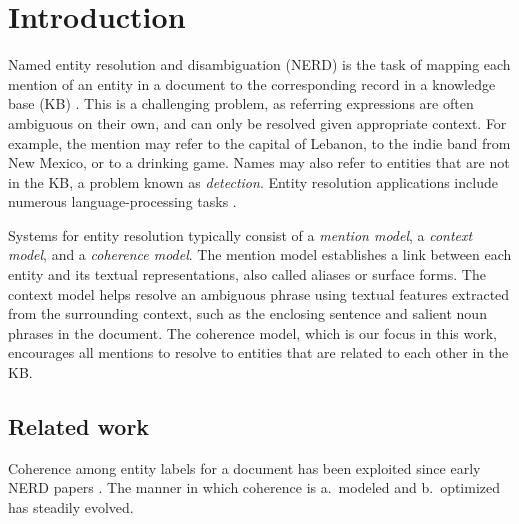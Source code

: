 \section{Introduction}
\label{sec:intro}

Named entity resolution and disambiguation (NERD) is the task of mapping each mention of an entity in a document to the corresponding record in a knowledge base (KB) \cite{BunescuP06,Cucerzan07,KulkarniSRC09,Dredze2010,Hoffart2011,Hachey2013130}.  
This is a challenging problem, as referring expressions are often ambiguous on their own, and can only be resolved given appropriate context. For example, the mention  may refer to the capital of Lebanon, to the indie band from New Mexico, or to a drinking game. Names may also refer to entities that are not in the KB, a problem known as \emph{{\NIL} detection}. 
Entity resolution applications include numerous language-processing tasks  \cite{Gabrilovich2007,Lin2012,finin2009Coreference,mayfield2009cross}. %

Systems for entity resolution typically consist of a \emph{mention model}, a \emph{context model}, and a \emph{coherence model}. The mention model establishes a link between each entity and its textual representations, also called aliases or surface forms. The context model helps resolve an ambiguous phrase using textual features extracted from the surrounding context, such as the enclosing sentence and salient noun phrases in the document. The coherence model, which is our focus in this work, encourages all mentions to resolve to entities that are related to each other in the KB. 


\subsection{Related work}
\label{sec:intro:related}

Coherence among entity labels for a document has been exploited since early NERD papers \cite{Cucerzan07,Milne2008}.  The manner in which coherence is a.~modeled and b.~optimized has steadily evolved.


